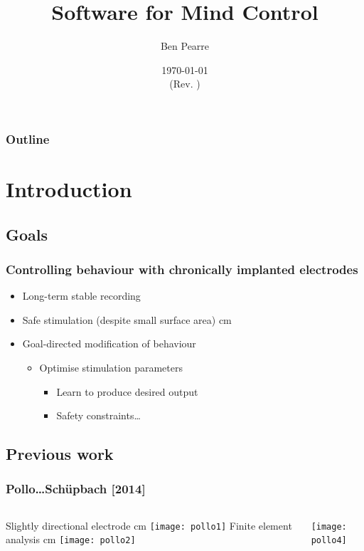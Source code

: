\documentclass{beamer}
\title{Software for Mind Control}
\author{Ben Pearre}
\date{\today\\{\small (Rev. \svnrev)}}
\begin{document}
\begin{frame}
  \titlepage
\end{frame}

\begin{frame}
  \frametitle{Outline}
  \tableofcontents
\end{frame}




\section{Introduction}
\subsection{Goals}

\begin{frame}
  \frametitle{Controlling behaviour with chronically implanted electrodes}
  \begin{itemize}
  \item Long-term stable recording
  \item Safe stimulation (despite small surface area)
     cm
  \item Goal-directed modification of behaviour
    \begin{itemize}
    \item Optimise stimulation parameters
      \begin{itemize}
      \item Learn to produce desired output
      \item Safety constraints\dots
      \end{itemize}
    \end{itemize}
  \end{itemize}
\end{frame}


\subsection{Previous work}

\begin{frame}
  \frametitle{Pollo\dots Sch\"upbach [2014]}
  \begin{columns}
    \column{5cm}
    Slightly directional electrode
     cm
    \texttt{[image: pollo1]}
    \column{5cm}
    Finite element analysis
     cm
    \texttt{[image: pollo2]}
    
    \texttt{[image: pollo4]}
  \end{columns}
\end{frame}
\end{document}
